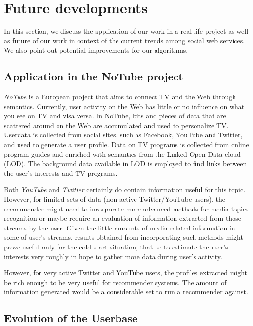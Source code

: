 \section{Future developments}

In this section, we discuss the application of our work in a real-life project
as well as future of our work in context of the current
trends among social web services. We also point out potential improvements for
our algorithms.

\subsection{Application in the NoTube project}

\textit{NoTube} is a European project that aims to connect TV and the Web through semantics.
Currently, user activity on the Web has little or no influence on what you see on TV and
visa versa. In NoTube, bits and pieces of data that are scattered around on the Web are
accumulated and used to personalize TV. Userdata is collected from social sites, such
as Facebook, YouTube and Twitter, and used to generate a user profile. Data on TV programs
is collected from online program guides and enriched with semantics from the Linked Open Data
cloud (LOD). The background data available in LOD is employed to find links between
the user's interests and TV programs.

Both \textit{YouTube} and \textit{Twitter} certainly do contain information
useful for this topic. However, for limited sets of data (non-active
Twitter/YouTube users), the recommender might need to incorporate more advanced methods
for media topics recognition or maybe require an evaluation of information extracted
from those streams by the user. Given the little amounts of media-related information
in some of user's streams, results obtained from incorporating such methods might
prove useful only for the cold-start situation, that is: to estimate the user's interests
very roughly in hope to gather more data during user's activity.

However, for very active Twitter and YouTube users, the profiles extracted
might be rich enough to be very useful for recommender systems. The amount of
information generated would be a considerable set to run a recommender against.

\subsection{Evolution of the Userbase}


